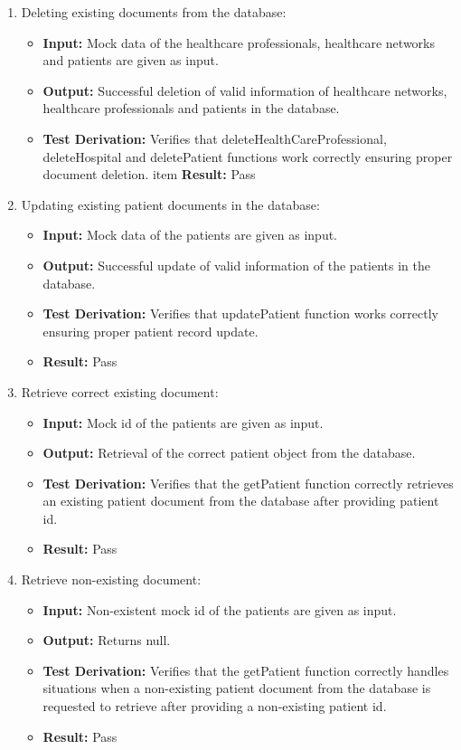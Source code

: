 \documentclass[12pt, titlepage]{article}
\begin{document}
\begin{enumerate}
    \item Deleting existing documents from the database:
      \begin{itemize}
        \item \textbf{Input:} Mock data of the healthcare professionals, healthcare networks and patients are given as input.  
        \item \textbf{Output:} Successful deletion of valid information of healthcare networks, healthcare professionals and patients in the database. 
        \item \textbf{Test Derivation:} Verifies that deleteHealthCareProfessional, deleteHospital and deletePatient functions work correctly ensuring proper document deletion.
        item \textbf{Result:} Pass
      \end{itemize}

    \item Updating existing patient documents in the database:
      \begin{itemize}
        \item \textbf{Input:} Mock data of the patients are given as input.  
        \item \textbf{Output:} Successful update of valid information of the patients in the database. 
        \item \textbf{Test Derivation:} Verifies that updatePatient function works correctly ensuring proper patient record update.
        \item \textbf{Result:} Pass
      \end{itemize}

    \item Retrieve correct existing document:
      \begin{itemize}
        \item \textbf{Input:} Mock id of the patients are given as input.  
        \item \textbf{Output:} Retrieval of the correct patient object from the database. 
        \item \textbf{Test Derivation:} Verifies that the getPatient function correctly retrieves an existing patient document from the database after providing patient id.
        \item \textbf{Result:} Pass
      \end{itemize}

    \item Retrieve non-existing document:
      \begin{itemize}
        \item \textbf{Input:} Non-existent mock id of the patients are given as input.  
        \item \textbf{Output:} Returns null. 
        \item \textbf{Test Derivation:} Verifies that the getPatient function correctly handles situations when a non-existing patient document from the database is requested to retrieve after providing a non-existing patient id.
        \item \textbf{Result:} Pass
      \end{itemize}
  \end{enumerate}
\end{document}
